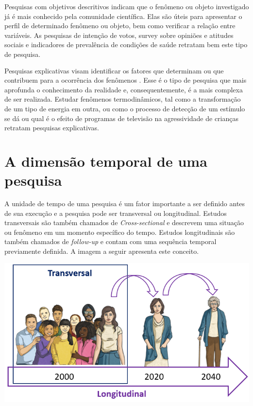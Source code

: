 \documentclass[
]{book}
\begin{document}
Pesquisas com objetivos descritivos indicam que o fenômeno ou objeto investigado já é mais conhecido pela comunidade científica. Elas são úteis para apresentar o perfil de determinado fenômeno ou objeto, bem como verificar a relação entre variáveis. As pesquisas de intenção de votos, survey sobre opiniões e atitudes sociais e indicadores de prevalência de condições de saúde retratam bem este tipo de pesquisa.

Pesquisas explicativas visam identificar os fatores que determinam ou que contribuem para a ocorrência dos fenômenos \citep{gil2002}. Esse é o tipo de pesquisa que mais aprofunda o conhecimento da realidade e, consequentemente, é a mais complexa de ser realizada. Estudar fenômenos termodinâmicos, tal como a transformação de um tipo de energia em outra, ou como o processo de detecção de um estímulo se dá \citep{Madsen1988} ou qual é o efeito de programas de televisão na agressividade de crianças \citeyearpar{Bandura1961} retratam pesquisas explicativas.

\hypertarget{a-dimensuxe3o-temporal-de-uma-pesquisa}{%
\section{A dimensão temporal de uma pesquisa}\label{a-dimensuxe3o-temporal-de-uma-pesquisa}}

A unidade de tempo de uma pesquisa é um fator importante a ser definido antes de sua execução e a pesquisa pode ser transversal ou longitudinal. Estudos transversais são também chamados de \emph{Cross-sectional} e descrevem uma situação ou fenômeno em um momento específico do tempo. Estudos longitudinais são também chamados de \emph{follow-up} e contam com uma sequência temporal previamente definida. A imagem a seguir apresenta este conceito.

\includegraphics{./img/cap_transversal_longitudinal.png}
\end{document}
